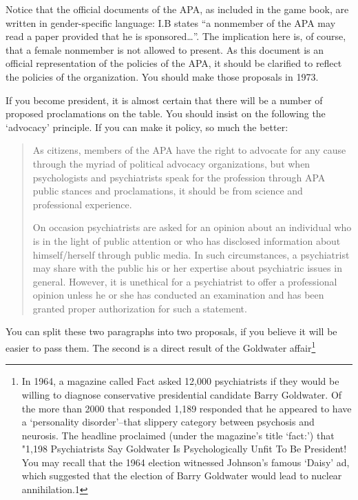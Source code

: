 \begin{refsection}
Notice that the official documents of the APA, as included in the game book, are written in gender-specific language: I.B states ``a nonmember of the APA may read a paper provided that he is sponsored{\ldots}''. The implication here is, of course, that a female nonmember is not allowed to present. As this document is an official representation of the policies of the APA, it should be clarified to reflect the policies of the organization. You should make those proposals in 1973.

If you become president, it is almost certain that there will be a number of proposed proclamations on the table. You should insist on the following the `advocacy' principle. If you can make it policy, so much the better:

\begin{quote}

As citizens, members of the APA have the right to advocate for any cause through the myriad of political advocacy organizations, but when psychologists and psychiatrists speak for the profession through APA public stances and proclamations, it should be from science and professional experience.

On occasion psychiatrists are asked for an opinion about an individual who is in the light of public attention or who has disclosed information about himself\slash herself through public media. In such circumstances, a psychiatrist may share with the public his or her expertise about psychiatric issues in general. However, it is unethical for a psychiatrist to offer a professional opinion unless he or she has conducted an examination and has been granted proper authorization for such a statement.
\end{quote}

You can split these two paragraphs into two proposals, if you believe it will be easier to pass them. The second is a direct result of the Goldwater affair\footnote{In 1964, a magazine called Fact asked 12,000 psychiatrists if they would be willing to diagnose conservative presidential candidate Barry Goldwater. Of the more than 2000 that responded 1,189 responded that he appeared to have a `personality disorder'--that slippery category between psychosis and neurosis. The headline proclaimed (under the magazine's title `fact:') that "1,198 Psychiatrists Say Goldwater Is Psychologically Unfit To Be President! You may recall that the 1964 election witnessed Johnson's famous `Daisy' ad, which suggested that the election of Barry Goldwater would lead to nuclear annihilation.⁠1 

}
\end{refsection}

